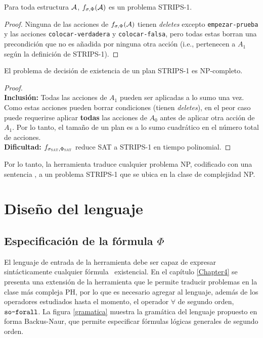 \begin{theorem}
Para toda estructura $\mathcal{A}$, $f_{\sigma, \Phi}(\mathcal{A})$ es un problema STRIPS-1.
\end{theorem}
\begin{proof}
Ninguna de las acciones de $f_{\sigma, \Phi}(\mathcal{A})$ tienen \textit{deletes} excepto
\texttt{empezar-prueba} y las acciones \texttt{colocar-verdadera} y
\texttt{colocar-falsa}, pero todas estas borran una precondición que no es
añadida por ninguna otra acción (i.e., pertenecen a $A_1$ según la definición
de STRIPS-1).
\end{proof}

\begin{theorem}
El problema de decisión de existencia de un plan STRIPS-1 es NP-completo.
\end{theorem}
\begin{proof}
\ \\ \textbf{Inclusión:} Todas las acciones de $A_1$ pueden ser aplicadas a lo
sumo una vez. Como estas acciones pueden borrar condiciones (tienen
\textit{deletes}), en el peor caso puede requerirse aplicar \textbf{todas} las
acciones de $A_0$ antes de aplicar otra acción de $A_1$. Por lo tanto, el
tamaño de un plan es a lo sumo cuadrático en el número total de acciones.
\\ \textbf{Dificultad:} $f_{\sigma_{\textsc{SAT}}, \Phi_{\textsc{SAT}}}$ reduce SAT a STRIPS-1 en
tiempo polinomial.
\end{proof}

Por lo tanto, la herramienta traduce cualquier problema NP, codificado con una
sentencia \SOE, a un problema STRIPS-1 que se ubica en la clase de complejidad
NP.

\section{Diseño del lenguaje}

\subsection{Especificación de la fórmula $\Phi$}
El lenguaje de entrada de la herramienta debe ser capaz de expresar
sintácticamente cualquier fórmula \LSO\ existencial. En el capítulo
\ref{Chapter4} se presenta una extensión de la herramienta que le permite
traducir problemas en la clase más compleja PH, por lo que es necesario
agregar al lenguaje, además de los operadores estudiados hasta el momento,
el operador $\forall$ de segundo orden, $\texttt{so-forall}$.
La figura \ref{gramatica} muestra la gramática del lenguaje propuesto
en forma Backus-Naur, que permite especificar fórmulas lógicas generales de
segundo orden.

